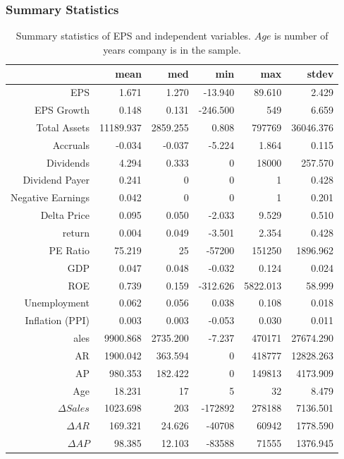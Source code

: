 \documentclass{beamer}
\newcommand\Fontvi{\fontsize{8}{7.2}\selectfont}
\begin{document}
\begin{frame}
\frametitle{Summary Statistics}
\begin{table}
\Fontvi
\centering
\begin{tabular}{rrrrrr}
  \hline
 & mean & med & min & max & stdev \\ 
  \hline
EPS & 1.671 & 1.270 & -13.940 & 89.610 & 2.429 \\ 
  EPS Growth & 0.148 & 0.131 & -246.500 & 549 & 6.659 \\ 
  Total Assets & 11189.937 & 2859.255 & 0.808 & 797769 & 36046.376 \\ 
  Accruals & -0.034 & -0.037 & -5.224 & 1.864 & 0.115 \\ 
  Dividends & 4.294 & 0.333 & 0 & 18000 & 257.570 \\ 
  Dividend Payer & 0.241 & 0 & 0 & 1 & 0.428 \\ 
  Negative Earnings & 0.042 & 0 & 0 & 1 & 0.201 \\ 
  Delta Price & 0.095 & 0.050 & -2.033 & 9.529 & 0.510 \\ 
  return & 0.004 & 0.049 & -3.501 & 2.354 & 0.428 \\ 
  PE Ratio & 75.219 & 25 & -57200 & 151250 & 1896.962 \\ 
  GDP & 0.047 & 0.048 & -0.032 & 0.124 & 0.024 \\ 
  ROE & 0.739 & 0.159 & -312.626 & 5822.013 & 58.999 \\ 
  Unemployment & 0.062 & 0.056 & 0.038 & 0.108 & 0.018 \\ 
  Inflation (PPI) & 0.003 & 0.003 & -0.053 & 0.030 & 0.011 \\ 
  ales & 9900.868 & 2735.200 & -7.237 & 470171 & 27674.290 \\ 
  AR & 1900.042 & 363.594 & 0 & 418777 & 12828.263 \\ 
  AP & 980.353 & 182.422 & 0 & 149813 & 4173.909 \\ 
  Age & 18.231 & 17 & 5 & 32 & 8.479 \\ 
  $\Delta Sales$ & 1023.698 & 203 & -172892 & 278188 & 7136.501 \\ 
  $\Delta AR$ & 169.321 & 24.626 & -40708 & 60942 & 1778.590 \\ 
 $\Delta AP$ & 98.385 & 12.103 & -83588 & 71555 & 1376.945 \\ 
   \hline
\end{tabular}
\caption{Summary statistics of EPS and independent variables. $Age$ is number of years company is in the sample.}
\label{summary-stats}
\end{table}
\end{frame}
\end{document}
